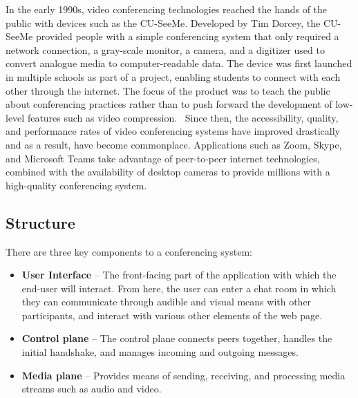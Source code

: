 In the early 1990s, video conferencing technologies reached the hands of the public with devices such as the CU-SeeMe. Developed by Tim Dorcey, the CU-SeeMe provided people with a simple conferencing system that only required a network connection, a gray-scale monitor, a camera, and a digitizer used to convert analogue media to computer-readable data. The device was first launched in multiple schools as part of a project, enabling students to connect with each other through the internet. The focus of the product was to teach the public about conferencing practices rather than to push forward the development of low-level features such as video compression.~\cite{dorcey1995cu} Since then, the accessibility, quality, and performance rates of video conferencing systems have improved drastically and as a result, have become commonplace. Applications such as Zoom, Skype, and Microsoft Teams take advantage of peer-to-peer internet technologies, combined with the availability of desktop cameras to provide millions with a high-quality conferencing system.    

\subsection{Structure}
There are three key components to a conferencing system:~\cite{firestone2007voice} 
\begin{itemize}
    \item \textbf{User Interface} – The front-facing part of the application with which the end-user will interact. From here, the user can enter a chat room in which they can communicate through audible and visual means with other participants, and interact with various other elements of the web page. 
    \item \textbf{Control plane} – The control plane connects peers together, handles the initial handshake, and manages incoming and outgoing messages.
    \item \textbf{Media plane} – Provides means of sending, receiving, and processing media streams such as audio and video. 
\end{itemize}

